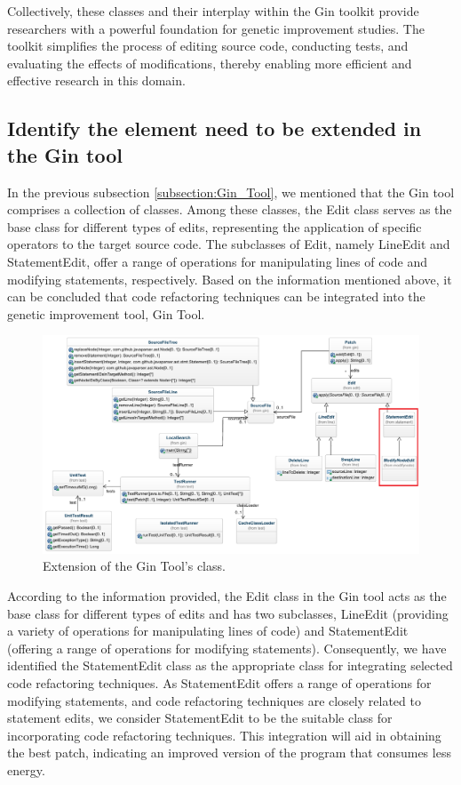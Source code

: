 \vspace{.5em}
Collectively, these classes and their interplay within the Gin toolkit provide researchers with a powerful foundation for genetic improvement studies. The toolkit simplifies the process of editing source code, conducting tests, and evaluating the effects of modifications, thereby enabling more efficient and effective research in this domain. \par

\subsection{Identify the element need to be extended in the Gin tool}

In the previous subsection \ref{subsection:Gin_Tool}, we mentioned that the Gin tool comprises a collection of classes. Among these classes, the Edit class serves as the base class for different types of edits, representing the application of specific operators to the target source code. The subclasses of Edit, namely LineEdit and StatementEdit, offer a range of operations for manipulating lines of code and modifying statements, respectively. Based on the information mentioned above, it can be concluded that code refactoring techniques can be integrated into the genetic improvement tool, Gin Tool.

\begin{figure}[ht!]
  \centering
  \includegraphics[width=.9\textwidth]{img/Gin_Core_Classes_extentions.png}
  \caption{Extension of the Gin Tool's class.~\cite{DBLP:conf/gecco/BrownleePABWW19}}
  \label{fig:Gin_Core_Classes_Extension}
\end{figure}

\vspace{.5em}
According to the information provided, the Edit class in the Gin tool acts as the base class for different types of edits and has two subclasses, LineEdit (providing a variety of operations for manipulating lines of code) and StatementEdit (offering a range of operations for modifying statements). Consequently, we have identified the StatementEdit class as the appropriate class for integrating selected code refactoring techniques. As StatementEdit offers a range of operations for modifying statements, and code refactoring techniques are closely related to statement edits, we consider StatementEdit to be the suitable class for incorporating code refactoring techniques. This integration will aid in obtaining the best patch, indicating an improved version of the program that consumes less energy.

